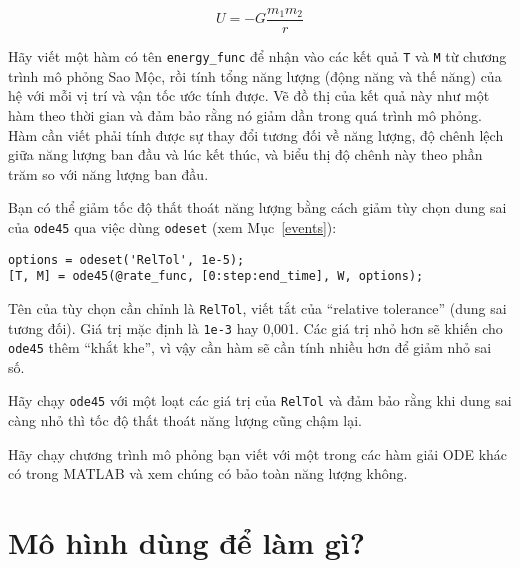 \documentclass[12pt]{book}
\begin{document}
\[ U = -G \frac{m_1 m_2}{r}  \]
%

\begin{ex}
Hãy viết một hàm có tên \verb#energy_func# để nhận vào các kết quả 
{\tt T} và {\tt M} từ chương trình mô phỏng Sao Mộc, rồi tính tổng
năng lượng (động năng và thế năng) của hệ với mỗi vị trí và vận tốc
ước tính được. Vẽ đồ thị của kết quả này như một hàm theo thời gian
và đảm bảo rằng nó giảm dần trong quá trình mô phỏng. Hàm cần viết
phải tính được sự thay đổi tương đối về năng lượng, độ chênh lệch giữa
năng lượng ban đầu và lúc kết thúc, và biểu thị độ chênh này theo phần
trăm so với năng lượng ban đầu.
\end{ex}

Bạn có thể giảm tốc độ thất thoát năng lượng bằng cách giảm tùy chọn
dung sai của {\tt ode45} qua việc dùng {\tt odeset} (xem Mục~\ref{events}):

\begin{verbatim}
options = odeset('RelTol', 1e-5);
[T, M] = ode45(@rate_func, [0:step:end_time], W, options);
\end{verbatim}
%
Tên của tùy chọn cần chỉnh là {\tt RelTol}, viết tắt của ``relative tolerance''
(dung sai tương đối). Giá trị mặc định là {\tt 1e-3} hay 0,001.  Các giá trị
nhỏ hơn sẽ khiến cho {\tt ode45} thêm ``khắt khe'', vì vậy cần hàm sẽ
cần tính nhiều hơn để giảm nhỏ sai số.

\begin{ex}
Hãy chạy {\tt ode45} với một loạt các giá trị của {\tt RelTol} và đảm bảo rằng
khi dung sai càng nhỏ thì tốc độ thất thoát năng lượng cũng chậm lại.
\end{ex}

\begin{ex}
Hãy chạy chương trình mô phỏng bạn viết với một trong các hàm giải ODE
khác có trong MATLAB và xem chúng có bảo toàn năng lượng không.
\end{ex}



\section{Mô hình dùng để làm gì?}
\end{document}
